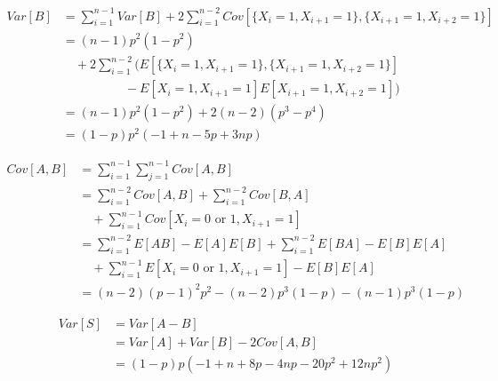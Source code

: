 \documentclass[12pt]{article}
\begin{document}
    \begin{equation*}
        \begin{split}
        Var[B]& =\sum_{i=1}^{n-1}Var[B]+2\sum_{i=1}^{n-2}Cov[\{X_i=1,
                X_{i+1}=1\}, \{X_{i+1}=1, X_{i+2}=1\}] \\
              & =(n-1)p^2(1-p^2) \\
              & \quad +2\sum_{i=1}^{n-2}\bigg(E[\{X_i=1, X_{i+1}=1\},
                \{X_{i+1}=1, X_{i+2}=1\}] \\
              & \qquad\qquad\quad -E[X_i=1, X_{i+1}=1]E[X_{i+1}=1,X_{i+2}=1]
                \bigg) \\
              & =(n-1)p^2(1-p^2)+2(n-2)(p^3-p^4) \\
              & =(1-p)p^2(-1+n-5p+3np)
        \end{split}
    \end{equation*}

    \begin{equation*}
        \begin{split}
        Cov[A,B]& =\sum_{i=1}^{n-1}\sum_{j=1}^{n-1}Cov[A,B] \\
                & =\sum_{i=1}^{n-2}Cov[A,B]+\sum_{i=1}^{n-2}Cov[B,A] \\
                & \quad +\sum_{i=1}^{n-1}Cov[X_i=0\text{ or }1,X_{i+1}=1] \\
                & =\sum_{i=1}^{n-2}E[AB]-E[A]E[B]+\sum_{i=1}^{n-2}E[BA]-
                  E[B]E[A] \\
                & \quad +\sum_{i=1}^{n-1}E[X_i=0\text{ or }1,X_{i+1}=1]-
                  E[B]E[A] \\
                & =(n-2)(p-1)^2p^2-(n-2)p^3(1-p)-(n-1)p^3(1-p)
        \end{split}
    \end{equation*}

    \begin{equation*}
        \begin{split}
        Var[S]& =Var[A-B] \\
              & =Var[A]+Var[B]-2Cov[A,B] \\
              & =(1-p)p(-1+n+8p-4np-20p^2+12np^2)
        \end{split}
    \end{equation*}
\end{document}
